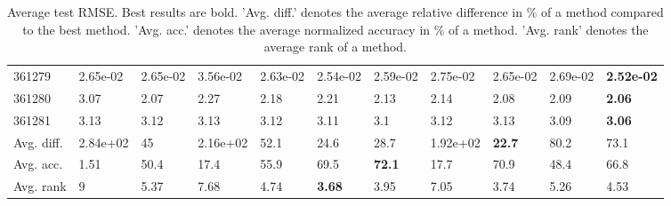 \begin{table}[ht!]
\begin{tabular}{lllllllllll}
  361279 & 2.65e-02 & 2.65e-02 & 3.56e-02 & 2.63e-02 & 2.54e-02 & 2.59e-02 & 2.75e-02 & 2.65e-02 & 2.69e-02 & \textbf{2.52e-02} \\ 
  361280 & 3.07 & 2.07 & 2.27 & 2.18 & 2.21 & 2.13 & 2.14 & 2.08 & 2.09 & \textbf{2.06} \\ 
  361281 & 3.13 & 3.12 & 3.13 & 3.12 & 3.11 & 3.1 & 3.12 & 3.13 & 3.09 & \textbf{3.06} \\ 
   \hline
Avg. diff. & 2.84e+02 & 45 & 2.16e+02 & 52.1 & 24.6 & 28.7 & 1.92e+02 & \textbf{22.7} & 80.2 & 73.1 \\ 
  Avg. acc. & 1.51 & 50.4 & 17.4 & 55.9 & 69.5 & \textbf{72.1} & 17.7 & 70.9 & 48.4 & 66.8 \\ 
  Avg. rank & 9 & 5.37 & 7.68 & 4.74 & \textbf{3.68} & 3.95 & 7.05 & 3.74 & 5.26 & 4.53 \\ 
   \hline
\hline
\end{tabular}
\endgroup
\caption{Average test RMSE. 
                  Best results are bold. 
                  'Avg. diff.' denotes the average relative difference in \% of a method compared to the best method.
                  'Avg. acc.' denotes the average normalized accuracy in \% of a method.
                  'Avg. rank' denotes the average rank of a method.} 
\label{TABLES/table_results_RMSE_umap}
\end{table}
